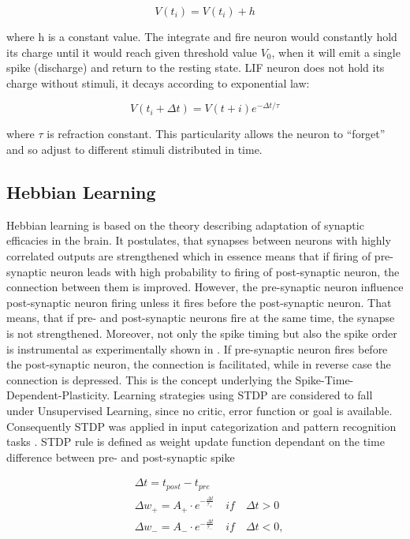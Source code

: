 \begin{equation}\label{eq:lifMembrane}	
	V(t_i)=V(t_i)+h
\end{equation}

where h is a constant value. The integrate and fire neuron would constantly hold its charge until it would reach given threshold value \(V_0\), when it will emit a single spike (discharge) and return to the resting state. LIF neuron does not hold its charge without stimuli, it decays according to exponential law:

\begin{equation}\label{lifDecay}
	V(t_i+\Delta t)=V(t+i) e^{-\Delta t/\tau}
\end{equation}

where \(\tau\) is refraction constant. This particularity allows the neuron to “forget” and so adjust to different stimuli distributed in time.


\subsection{Hebbian Learning}
Hebbian learning is based on the theory describing adaptation of synaptic efficacies in the brain. It postulates, that synapses between neurons with highly correlated outputs are strengthened \cite{12} which in essence means that if firing of pre-synaptic neuron leads with high probability to firing of post-synaptic neuron, the connection between them is improved. However, the pre-synaptic neuron influence post-synaptic neuron firing unless it fires before the post-synaptic neuron. That means, that if pre- and post-synaptic neurons fire at the same time, the synapse is not strengthened. Moreover, not only the spike timing but also the spike order is instrumental as experimentally shown in \cite{13}. If pre-synaptic neuron fires before the post-synaptic neuron, the connection is facilitated, while in reverse case the connection is depressed. This is the concept underlying the Spike-Time-Dependent-Plasticity. Learning strategies using STDP are considered to fall under Unsupervised Learning, since no critic, error function or goal is available. Consequently STDP was applied in input categorization and pattern recognition tasks \cite{14}. STDP rule is defined as weight update function dependant on the time difference between pre- and post-synaptic spike

\begin{equation*} 
	\begin{split} &
	\Delta t = t_{post} - t_{pre}\\&
	\Delta w_{+}=A_{+}\cdot e^{-\frac{\Delta t}{\tau_{+}}}\quad if\quad \Delta t > 0\\& 		\Delta w_{-}=A_{-}\cdot e^{-\frac{\Delta t}{\tau_{-}}}\quad if\quad \Delta t < 0, 			\end{split}	
	\label{eq:STDP}
\end{equation*}

